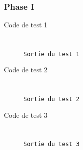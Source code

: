 \documentclass[11pt, a4paper, twoside, titlepage]{article}
\begin{document}
\newcommand{\fm}[3]{
\begin{figure}[H]
    \centering
    \inputminted[]{#3}{#1}
    \caption{\texttt{#2}}
\end{figure}
}

\newcommand{\fmt}[2]{\fm{#1}{#2}{text}}

\newcommand{\tmf}[4]{
\begin{figure}[H]
   \begin{minipage}{0.48\textwidth}
     \centering
     \inputminted[]{text}{#1}
     \caption{\texttt{#2}}
   \end{minipage}\hfill
   \begin{minipage}{0.48\textwidth}
     \centering    
    \inputminted[]{text}{#3}
     \caption{\texttt{#4}}
   \end{minipage}
\end{figure}
}

\renewcommand{\thesubsubsection}{\thesubsection.\Roman{subsubsection}}

\newcommand{\cdt}[1]{
\begin{center}
    \ttfamily
    \huge
    Code de test #1

\end{center}
}

\newcommand{\tc}[4]{
\cdt{#1}

\tmf{#3}{Entrée du test #1}{#4}{Sortie du test #1}
}

\newcommand{\tci}[3]{\tc{#1}{1}{#2}{#3}}
    
    \subsubsection{Phase I}

\tci{1}{../test/phase1/1.txt}{../test/out/phase1/1.txt}
\tci{2}{../test/phase1/2.txt}{../test/out/phase1/2.txt}
\tci{3}{../test/phase1/3.txt}{../test/out/phase1/3.txt}
\end{document}
